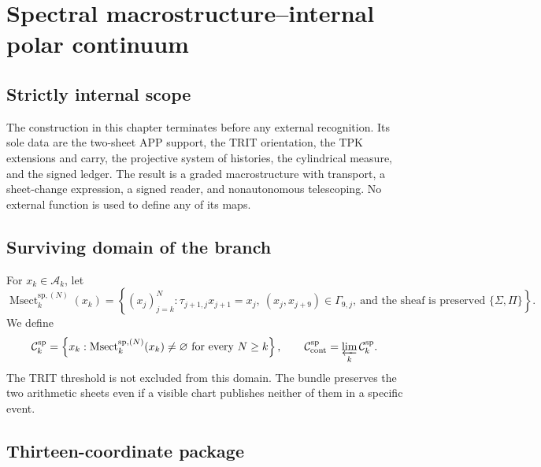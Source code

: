\iffalse
\chapter{Spectral macrostructure--internal polar continuum}
\label{chap:continuo-macro-sp-interna}

\section{Strictly internal scope}

The construction in this chapter terminates before any external recognition. Its sole data are the two-sheet APP support, the TRIT orientation, the TPK extensions and carry, the projective system of histories, the cylindrical measure, and the signed ledger. The result is a graded macrostructure with transport, a sheet-change expression, a signed reader, and nonautonomous telescoping. No external function is used to define any of its maps.

\section{Surviving domain of the branch}

For \(x_k\in\mathcal A_k\), let
\begin{equation}
\label{eq:continuo-sp-msect-n}
 \operatorname{Msect}^{\mathrm{sp},(N)}_k(x_k)
 =\left\{(x_j)_{j=k}^{N}:
 \tau_{j+1,j}x_{j+1}=x_j,
 \ (x_j,x_{j+9})\in\Gamma_{9,j},
 \ \text{and the sheaf is preserved }\{\Sigma,\Pi\}\right\}.
\end{equation}
We define
\begin{equation}
\label{eq:continuo-sp-dominio-superviviente}
 \mathcal C_k^{\mathrm{sp}}
 =\left\{x_k:
 \operatorname{Msect}^{\mathrm{sp},(N)}_k(x_k)\neq\varnothing
 \text{ for every }N\geq k\right\},
 \qquad
 \mathcal C_{\rm cont}^{\mathrm{sp}}
 =\varprojlim_k\mathcal C_k^{\mathrm{sp}}.
\end{equation}
The TRIT threshold is not excluded from this domain. The bundle preserves the two
arithmetic sheets even if a visible chart publishes neither of them in a
specific event.

\section{Thirteen-coordinate package}

